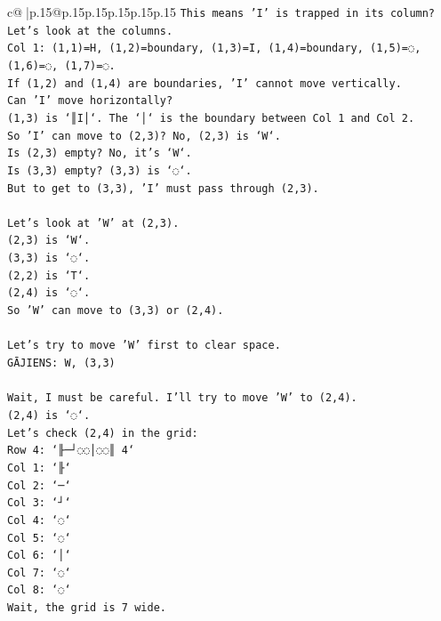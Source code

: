 \documentclass{article}
\begin{document}
{\begin{supertabular}{c@{$\;$}|p{.15\linewidth}@{}p{.15\linewidth}p{.15\linewidth}p{.15\linewidth}p{.15\linewidth}p{.15\linewidth}}
{{{\texttt{This means 'I' is trapped in its column?} \\
\texttt{Let's look at the columns.} \\
\texttt{Col 1: (1,1)=H, (1,2)=boundary, (1,3)=I, (1,4)=boundary, (1,5)=◌, (1,6)=◌, (1,7)=◌.} \\
\texttt{If (1,2) and (1,4) are boundaries, 'I' cannot move vertically.} \\
\texttt{Can 'I' move horizontally?} \\
\texttt{(1,3) is `║I│`. The `│` is the boundary between Col 1 and Col 2.} \\
\texttt{So 'I' can move to (2,3)? No, (2,3) is `W`.} \\
\texttt{Is (2,3) empty? No, it's `W`.} \\
\texttt{Is (3,3) empty? (3,3) is `◌`.} \\
\texttt{But to get to (3,3), 'I' must pass through (2,3).} \\
\\ 
\texttt{Let's look at 'W' at (2,3).} \\
\texttt{(2,3) is `W`.} \\
\texttt{(3,3) is `◌`.} \\
\texttt{(2,2) is `T`.} \\
\texttt{(2,4) is `◌`.} \\
\texttt{So 'W' can move to (3,3) or (2,4).} \\
\\ 
\texttt{Let's try to move 'W' first to clear space.} \\
\texttt{GĀJIENS: W, (3,3)} \\
\\ 
\texttt{Wait, I must be careful. I'll try to move 'W' to (2,4).} \\
\texttt{(2,4) is `◌`.} \\
\texttt{Let's check (2,4) in the grid:} \\
\texttt{Row 4: `╟─┘◌◌│◌◌║ 4`} \\
\texttt{Col 1: `╟`} \\
\texttt{Col 2: `─`} \\
\texttt{Col 3: `┘`} \\
\texttt{Col 4: `◌`} \\
\texttt{Col 5: `◌`} \\
\texttt{Col 6: `│`} \\
\texttt{Col 7: `◌`} \\
\texttt{Col 8: `◌`} \\
\texttt{Wait, the grid is 7 wide.} \\
}}}
\end{supertabular}}
\end{document}
